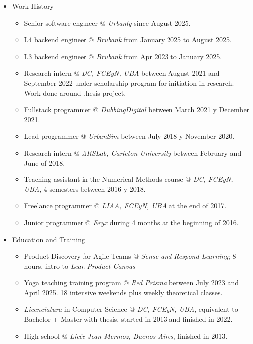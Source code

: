 \documentclass[a4paper]{article}
\begin{document}
\begin{itemize}
\item Work History
\begin{itemize}
  \item Senior software engineer @ \textit{Urbanly} since August 2025.
  \item L4 backend engineer @ \textit{Brubank} from January 2025 to August 2025.
  \item L3 backend engineer @ \textit{Brubank} from Apr 2023 to January 2025.
  \item Research intern @ \textit{DC, FCEyN, UBA} between August 2021 and September 2022 under scholarship program for
    initiation in research. Work done around thesis project.
  \item Fullstack programmer @ \textit{DubbingDigital} between March 2021 y December 2021.
  \item Lead programmer @ \textit{UrbanSim} between July 2018 y November 2020.
  \item Research intern @ \textit{ARSLab, Carleton University} between February and June of 2018.
  \item Teaching assistant in the Numerical Methods course @ \textit{DC, FCEyN, UBA}, 4 semesters between 2016 y 2018.
  \item Freelance programmer @ \textit{LIAA, FCEyN, UBA} at the end of 2017.
  \item Junior programmer @ \textit{Eryx} during 4 months at the beginning of 2016.
\end{itemize}

\item Education and Training
\begin{itemize}
    \item Product Discovery for Agile Teams @ \textit{Sense and Respond Learning}; 8 hours, intro to \textit{Lean Product Canvas}
    \item Yoga teaching training program @ \textit{Red Prisma} between July 2023 and April 2025. 18 intensive weekends plus weekly theoretical classes.
    \item \textit{Licenciatura} in Computer Science @ \textit{DC, FCEyN, UBA}, equivalent to Bachelor + Master with thesis, started in 2013 and finished in 2022.
    \item High school @ \textit{Licée Jean Mermoz, Buenos Aires}, finished in 2013.
\end{itemize}

\end{itemize}
\end{document}
